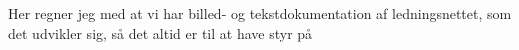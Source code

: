 Her regner jeg med at vi har billed- og tekstdokumentation af ledningsnettet, som det udvikler sig, så det altid er til at have styr på